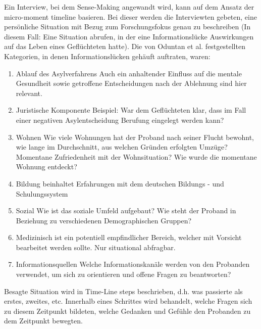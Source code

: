 \documentclass[12pt,oneside]{article}
\begin{document}
Ein Interview, bei dem Sense-Making angewandt wird, kann auf dem Ansatz der micro-moment timeline basieren. Bei dieser werden die Interviewten gebeten, eine pers\"onliche Situation mit Bezug zum Forschungsfokus genau zu beschreiben (In diesem Fall: Eine Situation abrufen, in der eine Informationsl\"ucke Auswirkungen auf das Leben eines Gefl\"uchteten hatte).
Die von Oduntan et al. festgestellten Kategorien, in denen Informationsl\"ucken geh\"auft auftraten, waren:
\begin{enumerate}
    \item Ablauf des Asylverfahrens\newline
    Auch ein anhaltender Einfluss auf die mentale Gesundheit sowie getroffene Entscheidungen nach der Ablehnung sind hier relevant.
    \item Juristische Komponente \newline
    Beispiel: War dem Gefl\"uchteten klar, dass im Fall einer negativen Asylentscheidung Berufung eingelegt werden kann?
    \item Wohnen \newline
    Wie viele Wohnungen hat der Proband nach seiner Flucht bewohnt, wie lange im Durchschnitt, aus welchen Gr\"unden erfolgten Umz\"uge? Momentane Zufriedenheit mit der Wohnsituation? Wie wurde die momentane Wohnung entdeckt?
    \item Bildung \newline
    beinhaltet Erfahrungen mit dem deutschen Bildungs - und Schulungssystem
    \item Sozial\newline
    Wie ist das soziale Umfeld aufgebaut? Wie steht der Proband in Beziehung zu verschiedenen Demographischen Gruppen?
    \item Medizinisch\newline
    ist ein potentiell empfindlicher Bereich, welcher mit Vorsicht bearbeitet werden sollte. Nur situational abfragbar.
    \item Informationsquellen\newline
    Welche Informationskan\"ale werden von den Probanden verwendet, um sich zu orientieren und offene Fragen zu beantworten?
\end{enumerate}
Besagte Situation wird in Time-Line steps beschrieben, d.h. was passierte als erstes, zweites, etc. Innerhalb eines Schrittes wird behandelt, welche Fragen sich zu diesem Zeitpunkt bildeten, welche Gedanken und Gef\"uhle den Probanden zu dem Zeitpunkt bewegten.\newline
\end{document}
